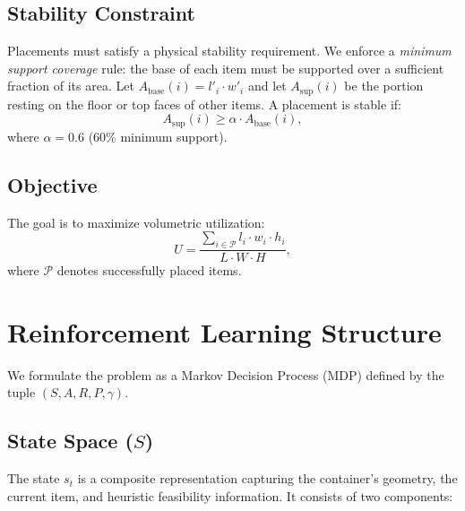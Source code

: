 \documentclass[runningheads]{llncs}
\begin{document}
\subsection{Stability Constraint}
Placements must satisfy a physical stability requirement. We enforce a \emph{minimum support coverage} rule: the base of each item must be supported over a sufficient fraction of its area. Let $A_{\text{base}}(i) = l'_i \cdot w'_i$ and let $A_{\text{sup}}(i)$ be the portion resting on the floor or top faces of other items. A placement is stable if:
\begin{equation}
    A_{\text{sup}}(i) \geq \alpha \cdot A_{\text{base}}(i),
\end{equation}
where $\alpha = 0.6$ (60\% minimum support).

\subsection{Objective}
The goal is to maximize volumetric utilization:
\begin{equation}
    U = \frac{\sum_{i \in \mathcal{P}} l_i \cdot w_i \cdot h_i}{L \cdot W \cdot H},
\end{equation}
where $\mathcal{P}$ denotes successfully placed items.

\section{Reinforcement Learning Structure}
We formulate the problem as a Markov Decision Process (MDP) defined by the tuple $(S, A, R, P, \gamma)$.

\subsection{State Space ($S$)}
The state $s_t$ is a composite representation capturing the container's geometry, the current item, and heuristic feasibility information. It consists of two components:
\end{document}
